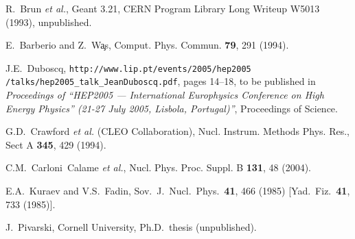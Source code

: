 \documentclass[aps,prl,twocolumn,superscriptaddress,showpacs,floatfix]{revtex4}
\begin{document}
\begin{thebibliography}{99}
R.~Brun {\it et al.}, {\textsc Geant} 3.21, CERN Program Library Long
Writeup W5013 (1993), unpublished.

E.~Barberio and Z.~W\c{a}s, Comput. Phys. Commun. {\bf 79}, 291 (1994).

J.E.~Duboscq, {\tt http://www.lip.pt/events/2005/hep2005 /talks/hep2005\_talk\_JeanDuboscq.pdf},
pages 14--18, to be published in {\sl Proceedings of ``HEP2005 ---
International Europhysics Conference on High Energy Physics'' (21-27
July 2005, Lisbola, Portugal)''}, Proceedings of Science.

G.D.~Crawford {\it et al.} (CLEO Collaboration),
Nucl. Instrum. Methods Phys. Res., Sect A {\bf 345}, 429 (1994).

C.M.~Carloni~Calame {\sl et al.},
Nucl. Phys. Proc. Suppl. B {\bf 131}, 48 (2004).

E.A.~Kuraev and V.S.~Fadin,
Sov.\ J.\ Nucl.\ Phys.\  {\bf 41}, 466 (1985)
[Yad.\ Fiz.\  {\bf 41}, 733 (1985)].

J.~Pivarski, Cornell University, Ph.D.~thesis (unpublished).

\end{thebibliography}
\end{document}
